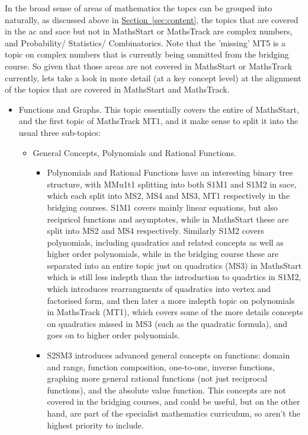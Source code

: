 \documentclass[twoside,12pt,a4paper]{report}
\newcommand{\refsec}[1]{\hyperref[sec:#1]{Section~\ref{sec:#1}}}
\begin{document}
In the broad sense of areas of mathematics the topcs can be grouped into naturally, as discussed above in \refsec{content}, the topics that are covered in the \gls{ac} and \gls{sace} but not in MathsStart or MathsTrack are complex numbers, and Probability/ Statistics/ Combinatorics. Note that the 'missing' MT5 is a topic on complex numbers that is currently being ommitted from the bridging course. So given that those areas are not covered in MathsStart or MathsTrack currently, lets take a look in more detail (at a key concept level) at the alignment of the topics that are covered in MathsStart and MathsTrack.

\begin{itemize}
	\item Functions and Graphs. This topic essentially covers the entire of MathsStart, and the first topic of MathsTrack MT1, and it make sense to split it into the usual three sub-topics:
		\begin{itemize} 
			\item General Concepts, Polynomials and Rational Functions. 
				\begin{itemize}
					\item Polynomials and Rational Functions have an interesting binary tree structure, with MMu1t1 splitting into both S1M1 and S1M2 in \gls{sace}, which each split into MS2, MS4 and MS3, MT1 respectively in the bridging courses. S1M1 covers mainly linear equations, but also recipricol functions and asymptotes, while in MathsStart these are split into MS2 and MS4 respectively. Similarly S1M2 covers polynomials, including quadratics and related concepts as well as higher order polynomials, while in the bridging course these are separated into an entire topic just on quadratics (MS3) in MathsStart which is still less indepth than the introduction to quadrtics in S1M2, which introduces rearrangments of quadratics into vertex and factorised form, and then later a more indepth topic on polynomials in MathsTrack (MT1), which covers some of the more details concepts on quadratics missed in MS3 (such as the quadratic formula), and goes on to higher order polynomials. 
					\item S2SM3 introduces advanced general concepts on functions: domain and range, function composition, one-to-one, inverse functions, graphing more general rational functions (not just reciprocal functions), and the absolute value function. This concepts are not covered in the bridging courses, and could be useful, but on the other hand, are part of the specialist mathematics curriculum, so aren't the highest priority to include.

\end{itemize}
\end{itemize}
\end{itemize}
\end{document}
